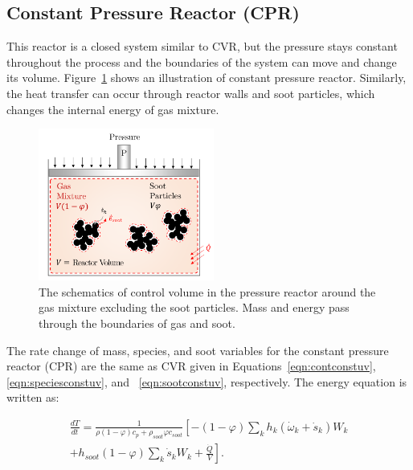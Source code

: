 \subsection{Constant Pressure Reactor (CPR)}

This reactor is a closed system similar to CVR, but the pressure stays constant throughout the process and the boundaries of the system can move and change its volume. Figure~\ref{fig:pressurecv} shows an illustration of constant pressure reactor. Similarly, the heat transfer can occur through reactor walls and soot particles, which changes the internal energy of gas mixture.

\begin{figure}[!htbp]
	\centering
	\includegraphics[height=50mm, ]{Figures/Theory/Pressure.pdf}
	\caption{The schematics of control volume in the pressure reactor around the gas mixture excluding the soot particles. Mass and energy pass through the boundaries of gas and soot.}
	\label{fig:pressurecv}
\end{figure}


The rate change of mass, species, and soot variables for the constant pressure reactor (CPR) are the same as CVR given in Equations~\ref{eqn:contconstuv}, \ref{eqn:speciesconstuv}, and ~\ref{eqn:sootconstuv}, respectively. The energy equation is written as:

\begin{equation}
	\begin{split}
		\frac{d T}{d t}=
		\frac{1}{\rho (1-\varphi) c_p+\rho_{soot}\varphi c_{soot}}
		\left[
		-(1-\varphi)\sum_k h_k
		\left(
		\dot{\omega}_k+\dot{s}_k
		\right) W_k \right. \\
		\left.
		+h_{soot}(1-\varphi)\sum_k \dot{s}_k W_k
		+\frac{\dot{Q}}{V}
		\right]
		\label{eqn:energypressure}.
	\end{split}
\end{equation}

